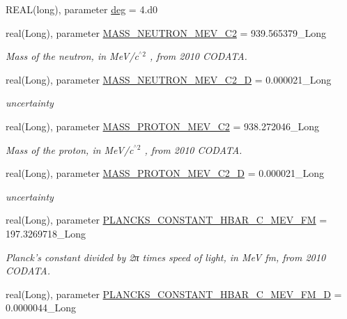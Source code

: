 \begin{DoxyCompactItemize}
\item 
REAL(long), parameter \hyperlink{namespacephys__cons_a553e3e17652770308e6bffcb8fcb5a95}{deg} = 4.d0
\item 
real(Long), parameter \hyperlink{namespacephys__cons_a9e80f5448f5f42cf9983890809e55d88}{MASS\_\-NEUTRON\_\-MEV\_\-C2} = 939.565379\_\-Long
\begin{DoxyCompactList}\small\item\em Mass of the neutron, in MeV/c$^{\mbox{$^\wedge$2}}$ , from 2010 CODATA. \item\end{DoxyCompactList}\item 
real(Long), parameter \hyperlink{namespacephys__cons_ab5fb46dc243eb307a344a134a593edd0}{MASS\_\-NEUTRON\_\-MEV\_\-C2\_\-D} = 0.000021\_\-Long
\begin{DoxyCompactList}\small\item\em uncertainty \item\end{DoxyCompactList}\item 
real(Long), parameter \hyperlink{namespacephys__cons_a3460d18828c87b266ab35b1cdeb4a0a5}{MASS\_\-PROTON\_\-MEV\_\-C2} = 938.272046\_\-Long
\begin{DoxyCompactList}\small\item\em Mass of the proton, in MeV/c$^{\mbox{$^\wedge$2}}$ , from 2010 CODATA. \item\end{DoxyCompactList}\item 
real(Long), parameter \hyperlink{namespacephys__cons_a3299e2ce8c6c720ed740eff7968b27a8}{MASS\_\-PROTON\_\-MEV\_\-C2\_\-D} = 0.000021\_\-Long
\begin{DoxyCompactList}\small\item\em uncertainty \item\end{DoxyCompactList}\item 
real(Long), parameter \hyperlink{namespacephys__cons_a7efa4134b36e258435906be7fd9ca165}{PLANCKS\_\-CONSTANT\_\-HBAR\_\-C\_\-MEV\_\-FM} = 197.3269718\_\-Long
\begin{DoxyCompactList}\small\item\em Planck's constant divided by 2π times speed of light, in MeV fm, from 2010 CODATA. \item\end{DoxyCompactList}\item 
real(Long), parameter \hyperlink{namespacephys__cons_a86cb86e86548ce7318d0143b2f4b2f88}{PLANCKS\_\-CONSTANT\_\-HBAR\_\-C\_\-MEV\_\-FM\_\-D} = 0.0000044\_\-Long
\end{DoxyCompactItemize}


